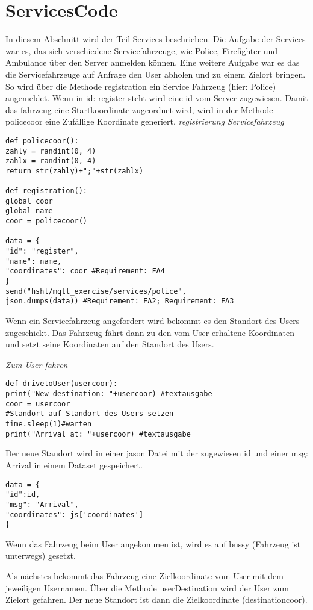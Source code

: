 \section{ServicesCode}
In diesem Abschnitt wird der Teil Services beschrieben. 
Die Aufgabe der Services war es, das sich verschiedene Servicefahrzeuge, wie Police, Firefighter und Ambulance über den Server anmelden können. Eine weitere Aufgabe war es das die Servicefahrzeuge auf Anfrage den User abholen und zu einem Zielort bringen.
So wird über die Methode registration ein Service Fahrzeug (hier: Police) angemeldet. Wenn in id: register steht wird eine id vom Server zugewiesen.
Damit das fahrzeug eine Startkoordinate zugeordnet wird, wird in der Methode policecoor eine Zufällige Koordinate generiert. 
\newline
\textit{registrierung Servicefahrzeug}
\begin{lstlisting}
def policecoor(): 
zahly = randint(0, 4)
zahlx = randint(0, 4)
return str(zahly)+";"+str(zahlx)

def registration():
global coor
global name
coor = policecoor()

data = {
"id": "register",
"name": name,
"coordinates": coor #Requirement: FA4
}
send("hshl/mqtt_exercise/services/police", 
json.dumps(data)) #Requirement: FA2; Requirement: FA3
\end{lstlisting}

Wenn ein Servicefahrzeug angefordert wird bekommt es den Standort des Users zugeschickt. 
Das Fahrzeug fährt dann zu den vom User erhaltene Koordinaten und setzt seine Koordinaten auf den Standort des Users.


\textit{Zum User fahren}
\begin{lstlisting}
def drivetoUser(usercoor):
print("New destination: "+usercoor) #textausgabe
coor = usercoor   
#Standort auf Standort des Users setzen
time.sleep(1)#warten
print("Arrival at: "+usercoor) #textausgabe
\end{lstlisting}


Der neue Standort wird in einer jason Datei mit der zugewiesen id und einer msg: Arrival in einem Dataset gespeichert.
\begin{lstlisting}
data = {
"id":id,
"msg": "Arrival",
"coordinates": js['coordinates']
}
\end{lstlisting}
Wenn das Fahrzeug beim User angekommen ist, wird es auf bussy (Fahrzeug ist unterwegs) gesetzt.


Als nächstes bekommt das Fahrzeug eine Zielkoordinate vom User mit dem jeweiligen Usernamen.
Über die Methode userDestination wird der User zum Zielort gefahren. Der neue Standort ist dann die Zielkoordinate (destinationcoor).


